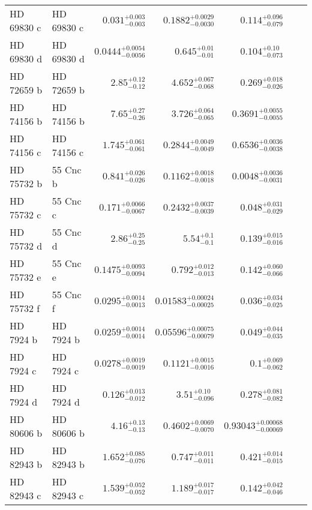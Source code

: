 \begin{longtable*}{llrrrrr}
HD 69830 c & HD 69830 c & $0.031^{+0.003}_{-0.003}$ & $0.1882^{+0.0029}_{-0.0030}$ & $0.114^{+0.096}_{-0.079}$ & \cite{Lovis06} & \\
HD 69830 d & HD 69830 d & $0.0444^{+0.0054}_{-0.0056}$ & $0.645^{+0.01}_{-0.01}$ & $0.104^{+0.10}_{-0.073}$ & \cite{Lovis06} & \\
HD 72659 b & HD 72659 b & $2.85^{+0.12}_{-0.12}$ & $4.652^{+0.067}_{-0.068}$ & $0.269^{+0.018}_{-0.026}$ & \cite{Butler03} & \\
HD 74156 b & HD 74156 b & $7.65^{+0.27}_{-0.26}$ & $3.726^{+0.064}_{-0.065}$ & $0.3691^{+0.0055}_{-0.0055}$ & \cite{Naef04} & \\
HD 74156 c & HD 74156 c & $1.745^{+0.061}_{-0.061}$ & $0.2844^{+0.0049}_{-0.0049}$ & $0.6536^{+0.0036}_{-0.0038}$ & \cite{Naef04} & \\
HD 75732 b & 55 Cnc b & $0.841^{+0.026}_{-0.026}$ & $0.1162^{+0.0018}_{-0.0018}$ & $0.0048^{+0.0036}_{-0.0031}$ & \cite{Butler97} & \\
HD 75732 c & 55 Cnc c & $0.171^{+0.0066}_{-0.0067}$ & $0.2432^{+0.0037}_{-0.0039}$ & $0.048^{+0.031}_{-0.029}$ & \cite{Marcy02} & \\
HD 75732 d & 55 Cnc d & $2.86^{+0.25}_{-0.25}$ & $5.54^{+0.1}_{-0.1}$ & $0.139^{+0.015}_{-0.016}$ & \cite{Marcy02} & \\
HD 75732 e & 55 Cnc e & $0.1475^{+0.0093}_{-0.0094}$ & $0.792^{+0.012}_{-0.013}$ & $0.142^{+0.060}_{-0.066}$ & \cite{McArthur04} & \\
HD 75732 f & 55 Cnc f & $0.0295^{+0.0014}_{-0.0013}$ & $0.01583^{+0.00024}_{-0.00025}$ & $0.036^{+0.034}_{-0.025}$ & \cite{Fischer08} & \\
HD 7924 b & HD 7924 b & $0.0259^{+0.0014}_{-0.0014}$ & $0.05596^{+0.00075}_{-0.00079}$ & $0.049^{+0.044}_{-0.035}$ & \cite{Fulton15} & \\
HD 7924 c & HD 7924 c & $0.0278^{+0.0019}_{-0.0019}$ & $0.1121^{+0.0015}_{-0.0016}$ & $0.1^{+0.069}_{-0.062}$ & \cite{Fulton15} & \\
HD 7924 d & HD 7924 d & $0.126^{+0.013}_{-0.012}$ & $3.51^{+0.10}_{-0.096}$ & $0.278^{+0.081}_{-0.082}$ & \cite{Fulton15} & \\
HD 80606 b & HD 80606 b & $4.16^{+0.13}_{-0.13}$ & $0.4602^{+0.0069}_{-0.0070}$ & $0.93043^{+0.00068}_{-0.00069}$ & \cite{Naef01} & \\
HD 82943 b & HD 82943 b & $1.652^{+0.085}_{-0.076}$ & $0.747^{+0.011}_{-0.011}$ & $0.421^{+0.014}_{-0.015}$ & \cite{Mayor04} & \\
HD 82943 c & HD 82943 c & $1.539^{+0.052}_{-0.052}$ & $1.189^{+0.017}_{-0.017}$ & $0.142^{+0.042}_{-0.046}$ & \cite{Mayor04} & \\

\end{longtable*}
